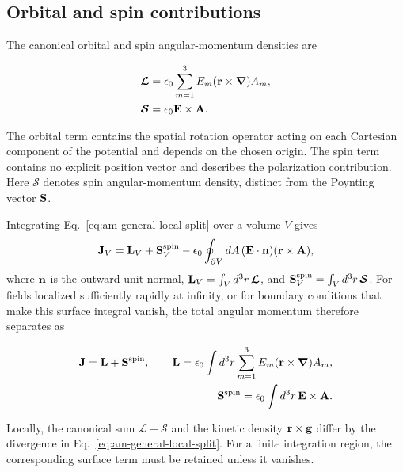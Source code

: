 \subsection{Orbital and spin contributions}

The canonical orbital and spin angular-momentum densities are
\begin{importantbox}
  \begin{align}
    \boldsymbol{\mathcal L}
    &=\epsilon_0\sum_{m=1}^{3}E_m
      ({\bf r}\times\boldsymbol{\nabla})A_m,
    \label{eq:am-general-orbital-density}\\
    \boldsymbol{\mathcal S}
    &=\epsilon_0{\bf E}\times{\bf A}.
    \label{eq:am-general-spin-density}
  \end{align}
\end{importantbox}
The orbital term contains the spatial rotation operator acting on each
Cartesian component of the potential and depends on the chosen origin.
The spin term contains no explicit position vector and describes the
polarization contribution.  Here $\boldsymbol{\mathcal S}$ denotes spin
angular-momentum density, distinct from the Poynting vector ${\bf S}$.

Integrating Eq.~\eqref{eq:am-general-local-split} over a volume $V$ gives
\begin{align}
  {\bf J}_V
  ={\bf L}_V+{\bf S}_V^{\mathrm{spin}}
  -\epsilon_0\oint_{\partial V}dA\,
    ({\bf E}\cdot{\bf n})({\bf r}\times{\bf A}),
  \label{eq:am-general-split-boundary}
\end{align}
where ${\bf n}$ is the outward unit normal,
${\bf L}_V=\int_V d^3r\,\boldsymbol{\mathcal L}$, and
${\bf S}_V^{\mathrm{spin}}=\int_V d^3r\,\boldsymbol{\mathcal S}$.
For fields localized sufficiently rapidly at infinity, or for boundary
conditions that make this surface integral vanish, the total angular
momentum therefore separates as
\begin{importantbox}
  \begin{align}
    {\bf J}={\bf L}+{\bf S}^{\mathrm{spin}},\qquad
    {\bf L}=\epsilon_0\int d^3r\sum_{m=1}^{3}
      E_m({\bf r}\times\boldsymbol{\nabla})A_m,\\
    {\bf S}^{\mathrm{spin}}
    =\epsilon_0\int d^3r\,{\bf E}\times{\bf A}.
    \label{eq:am-general-integrated-spin-orbital-split}
  \end{align}
\end{importantbox}
Locally, the canonical sum
$\boldsymbol{\mathcal L}+\boldsymbol{\mathcal S}$ and the kinetic density
${\bf r}\times{\bf g}$ differ by the divergence in
Eq.~\eqref{eq:am-general-local-split}.  For a finite integration region,
the corresponding surface term must be retained unless it vanishes.

